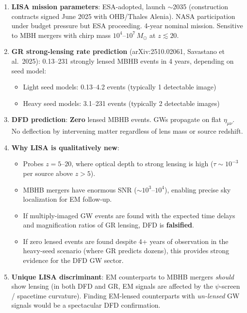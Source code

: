 \documentclass[11pt]{article}
\begin{document}
\begin{enumerate}
\item \textbf{LISA mission parameters}: ESA-adopted, launch $\sim$2035
  (construction contracts signed June 2025 with OHB/Thales Alenia).
  NASA participation under budget pressure but ESA proceeding.
  4-year nominal mission. Sensitive to MBH mergers with chirp mass
  $10^4$--$10^7\,M_\odot$ at $z \lesssim 20$.

\item \textbf{GR strong-lensing rate prediction} (arXiv:2510.02061,
  Savastano et al.\ 2025): 0.13--231 strongly lensed MBHB events in
  4 years, depending on seed model:
  \begin{itemize}
  \item Light seed models: 0.13--4.2 events (typically 1 detectable image)
  \item Heavy seed models: 3.1--231 events (typically 2 detectable images)
  \end{itemize}

\item \textbf{DFD prediction}: \textbf{Zero} lensed MBHB events. GWs
  propagate on flat $\eta_{\mu\nu}$. No deflection by intervening matter
  regardless of lens mass or source redshift.

\item \textbf{Why LISA is qualitatively new}:
  \begin{itemize}
  \item Probes $z = 5$--$20$, where optical depth to strong lensing is
    high ($\tau \sim 10^{-3}$ per source above $z > 5$).
  \item MBHB mergers have enormous SNR ($\sim 10^3$--$10^4$), enabling
    precise sky localization for EM follow-up.
  \item If multiply-imaged GW events are found with the expected
    time delays and magnification ratios of GR lensing, DFD is
    \textbf{falsified}.
  \item If zero lensed events are found despite 4+ years of observation
    in the heavy-seed scenario (where GR predicts dozens), this provides
    strong evidence for the DFD GW sector.
  \end{itemize}

\item \textbf{Unique LISA discriminant}: EM counterparts to MBHB mergers
  \emph{should} show lensing (in both DFD and GR, EM signals are affected
  by the $\psi$-screen / spacetime curvature). Finding EM-lensed counterparts
  with \emph{un-lensed} GW signals would be a spectacular DFD confirmation.
\end{enumerate}
\end{document}
